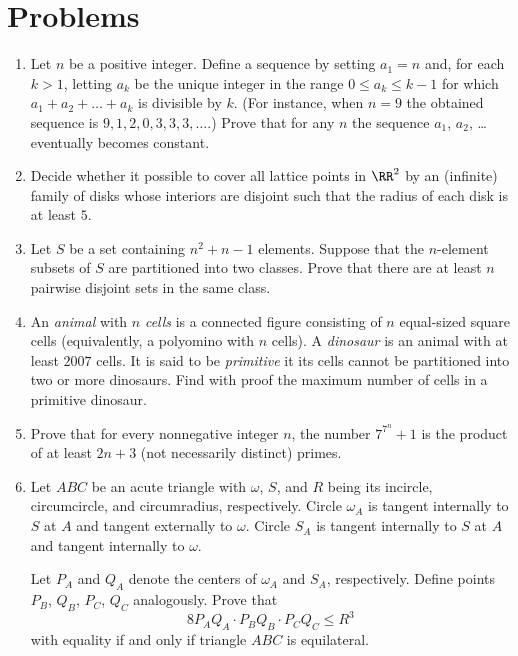 \documentclass[11pt]{scrartcl}
\begin{document}
\section{Problems}
\begin{enumerate}[\bfseries 1.]
\item %
Let $n$ be a positive integer.
Define a sequence by setting $a_1 = n$ and, for each $k > 1$,
letting $a_k$ be the unique integer in the range $0 \leq a_k \leq k-1$
for which $a_1 + a_2 + \dots + a_k$ is divisible by $k$.
(For instance, when $n = 9$
the obtained sequence is $9,1,2,0,3,3,3,\dots$.)
Prove that for any $n$ the sequence $a_1$, $a_2$, \dots
eventually becomes constant.

\item %
Decide whether it possible to cover all lattice points in $\RR^2$
by an (infinite) family of disks whose interiors are disjoint
such that the radius of each disk is at least $5$.

\item %
Let $S$ be a set containing $n^2+n-1$ elements.
Suppose that the $n$-element subsets of $S$
are partitioned into two classes.
Prove that there are at least $n$ pairwise disjoint sets
in the same class.

\item %
An \emph{animal} with $n$ \emph{cells}
is a connected figure consisting of $n$ equal-sized square cells
(equivalently, a polyomino with $n$ cells).
A \emph{dinosaur} is an animal with at least $2007$ cells.
It is said to be \emph{primitive}
it its cells cannot be partitioned into two or more dinosaurs.
Find with proof the maximum number of cells in a primitive dinosaur.

\item %
Prove that for every nonnegative integer $n$,
the number $7^{7^n}+1$ is the product
of at least $2n+3$ (not necessarily distinct) primes.

\item %
Let $ABC$ be an acute triangle
with $\omega$, $S$, and $R$ being its incircle,
circumcircle, and circumradius, respectively.
Circle $\omega_{A}$ is tangent internally to $S$
at $A$ and tangent externally to $\omega$.
Circle $S_{A}$ is tangent internally to $S$
at $A$ and tangent internally to $\omega$.

Let $P_A$ and $Q_A$ denote
the centers of $\omega_A$ and $S_A$, respectively.
Define points $P_B$, $Q_B$, $P_C$, $Q_C$ analogously.
Prove that
\[ 8 P_A Q_A \cdot P_B Q_B \cdot P_C Q_C \le R^3 \]
with equality if and only if triangle $ABC$ is equilateral.

\end{enumerate}
\pagebreak
\end{document}
